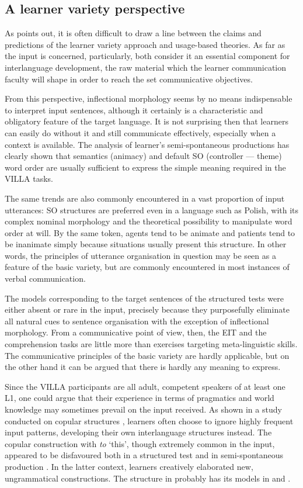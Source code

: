 \subsection{A learner variety perspective}\label{sec:08:1.3}

As \citet{Dimroth2018} points out, it is often difficult to draw a line between the claims and predictions of the learner variety approach and usage-based theories. As far as the input is concerned, particularly, both consider it an essential component for interlanguage development, the raw material which the learner communication faculty will shape in order to reach the set communicative objectives.

From this perspective, inflectional morphology seems by no means indispensable to interpret input sentences, although it certainly is a characteristic and obligatory feature of the target language. It is not surprising then that learners can easily do without it and still communicate effectively, especially when a context is available. The analysis of learner’s semi-spontaneous productions has clearly shown that semantics (animacy) and default SO (controller — theme) word order are usually sufficient to express the simple meaning required in the VILLA tasks. 

The same trends are also commonly encountered in a vast proportion of input utterances: SO structures are preferred even in a language such as Polish, with its complex nominal morphology and the theoretical possibility to manipulate word order at will. By the same token, agents tend to be animate and patients tend to be inanimate simply because situations usually present this structure. In other words, the principles of utterance organisation in question may be seen as a feature of the basic variety, but are commonly encountered in most instances of verbal communication.

The models corresponding to the target sentences of the structured tests were either absent or rare in the input, precisely because they purposefully eliminate all natural cues to sentence organisation with the exception of inflectional morphology. From a communicative point of view, then, the EIT and the comprehension tasks are little more than exercises targeting meta-linguistic skills. The communicative principles of the basic variety are hardly applicable, but on the other hand it can be argued that there is hardly any meaning to express. 

Since the VILLA participants are all adult, competent speakers of at least one L1, one could argue that their experience in terms of pragmatics and world knowledge may sometimes prevail on the input received. As shown in a study conducted on copular structures \citep{Saturno2015}, learners often choose to ignore highly frequent input patterns, developing their own interlanguage structures instead. The copular construction with \textit{to} ‘this’, though extremely common in the input, appeared to be disfavoured both in a structured test and in semi-spon\-ta\-ne\-ous production \citep{Saturno2018}. In the latter context, learners creatively elaborated new, ungrammatical constructions. The structure in  probably has its models in  and .

